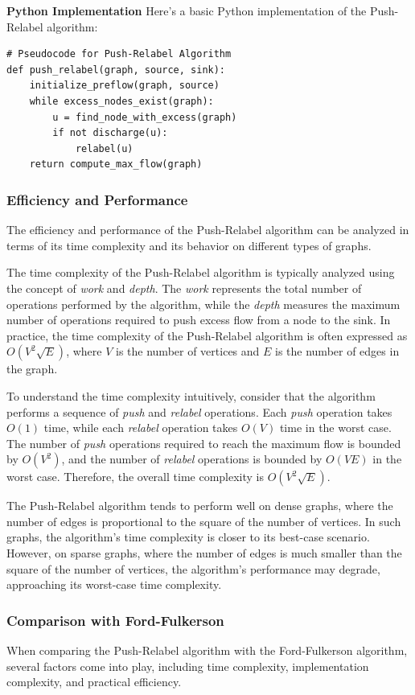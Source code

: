 \documentclass[12pt]{book} %
\begin{document}
\textbf{Python Implementation}
Here's a basic Python implementation of the Push-Relabel algorithm:
\FloatBarrier
\begin{lstlisting}
# Pseudocode for Push-Relabel Algorithm
def push_relabel(graph, source, sink):
    initialize_preflow(graph, source)
    while excess_nodes_exist(graph):
        u = find_node_with_excess(graph)
        if not discharge(u):
            relabel(u)
    return compute_max_flow(graph)
\end{lstlisting}

\subsubsection{Efficiency and Performance}
The efficiency and performance of the Push-Relabel algorithm can be analyzed in terms of its time complexity and its behavior on different types of graphs.

The time complexity of the Push-Relabel algorithm is typically analyzed using the concept of \textit{work} and \textit{depth}. The \textit{work} represents the total number of operations performed by the algorithm, while the \textit{depth} measures the maximum number of operations required to push excess flow from a node to the sink. In practice, the time complexity of the Push-Relabel algorithm is often expressed as \(O(V^2 \sqrt{E})\), where \(V\) is the number of vertices and \(E\) is the number of edges in the graph.

To understand the time complexity intuitively, consider that the algorithm performs a sequence of \textit{push} and \textit{relabel} operations. Each \textit{push} operation takes \(O(1)\) time, while each \textit{relabel} operation takes \(O(V)\) time in the worst case. The number of \textit{push} operations required to reach the maximum flow is bounded by \(O(V^2)\), and the number of \textit{relabel} operations is bounded by \(O(VE)\) in the worst case. Therefore, the overall time complexity is \(O(V^2 \sqrt{E})\).

The Push-Relabel algorithm tends to perform well on dense graphs, where the number of edges is proportional to the square of the number of vertices. In such graphs, the algorithm's time complexity is closer to its best-case scenario. However, on sparse graphs, where the number of edges is much smaller than the square of the number of vertices, the algorithm's performance may degrade, approaching its worst-case time complexity.


\subsubsection{Comparison with Ford-Fulkerson}
When comparing the Push-Relabel algorithm with the Ford-Fulkerson algorithm, several factors come into play, including time complexity, implementation complexity, and practical efficiency.
\end{document}
